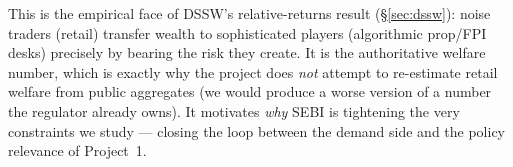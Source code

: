 \begin{takeaway}
This is the empirical face of DSSW's relative-returns result (\S\ref{sec:dssw}): noise traders (retail) transfer wealth to sophisticated players (algorithmic prop/FPI desks) precisely by bearing the risk they create. It is the authoritative welfare number, which is exactly why the project does \emph{not} attempt to re-estimate retail welfare from public aggregates (we would produce a worse version of a number the regulator already owns). It motivates \emph{why} SEBI is tightening the very constraints we study --- closing the loop between the demand side and the policy relevance of Project~1.
\end{takeaway}
